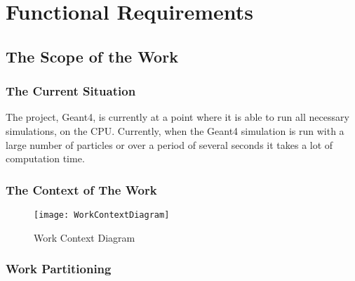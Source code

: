 \documentclass[12pt]{article}
\newcommand{\todo}[1]{\textcolor{red}{[TODO: #1]}} \else
\newcommand{\authornote}[3]{} \newcommand{\todo}[1]{} \fi
\newcommand{\ds}[1]{\authornote{blue}{DS}{#1}} %
\newcommand{\vr}[1]{\authornote{green}{VR}{#1}}
\begin{document}
\section{Functional Requirements}

\subsection{The Scope of the Work} %
\subsubsection{The Current Situation}
The project, Geant4, is currently at a point where it is able to run all necessary simulations, on the CPU. Currently, when the Geant4 simulation is run with a large number of particles or over a period of several seconds it takes a lot of computation time.

\subsubsection{The Context of The Work}
\begin{figure}[h]
\caption{Work Context Diagram}
\texttt{[image: WorkContextDiagram]} 
\end{figure} 

\ds{Figure caption?}\vr{Added caption and revised diagram}
\subsubsection{Work Partitioning}
%
\end{document}
